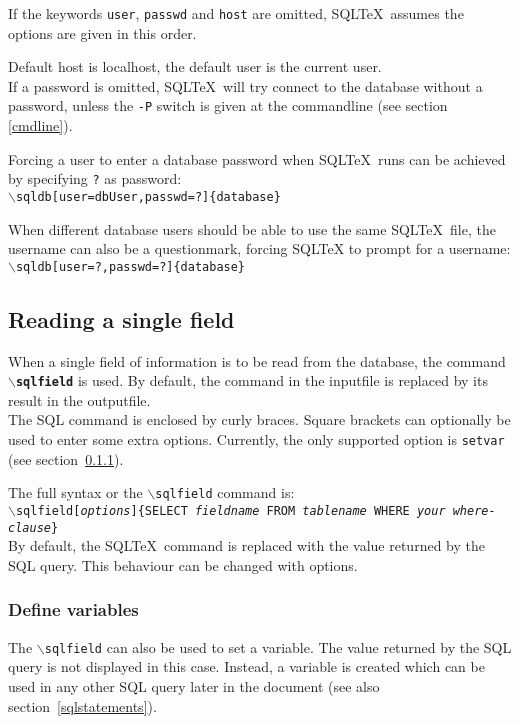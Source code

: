 \documentclass{article}
\newcommand{\bs}{\ensuremath{\backslash}}
\newcommand{\vs}{\vspace{3mm}}
\begin{document}
\vs

If the keywords \texttt{user}, \texttt{passwd} and \texttt{host} are omitted, SQL\TeX\ assumes the options are given in
this order.

Default host is localhost, the default user is the current user.\\
If a password is omitted, SQL\TeX\ will try connect to the database without a password, unless the \texttt{-P} switch is given at the commandline
(see section \ref{cmdline}).

\vs

Forcing a user to enter a database password when SQL\TeX\ runs can be achieved by specifying \texttt{?} as password:\\
\texttt{\bs sqldb[user=dbUser,passwd=?]\{database\}}

When different database users should be able to use the same SQL\TeX\ file, the username can also be a questionmark, forcing SQL\TeX
to prompt for a username:\\
\texttt{\bs sqldb[user=?,passwd=?]\{database\}}

\subsection{Reading a single field}\label{sqlfield}

When a single field of information is to be read from the database, the command \texttt{\textbf{\bs sqlfield}}
is used. By default, the command in the inputfile is replaced by its result in the outputfile.\\
The SQL command is enclosed by curly braces. Square brackets can optionally be used to enter some extra options.
Currently, the only supported option is \texttt{setvar} (see section~\ref{vars}).

The full syntax or the \texttt{\bs sqlfield} command is:\\
\texttt{\bs sqlfield[\textit{options}]\{SELECT \textit{fieldname} FROM \textit{tablename} WHERE \textit{your where-clause}\}} \\
By default, the SQL\TeX\ command is replaced with the value returned by the SQL query. This behaviour
can be changed with options.


\subsubsection{Define variables}\label{vars}

The \texttt{\bs sqlfield} can also be used to set a variable. The value returned by the SQL query is not
displayed in this case. Instead, a variable is created which can be used in any other SQL query later in
the document (see also section~\ref{sqlstatements}).
\end{document}
